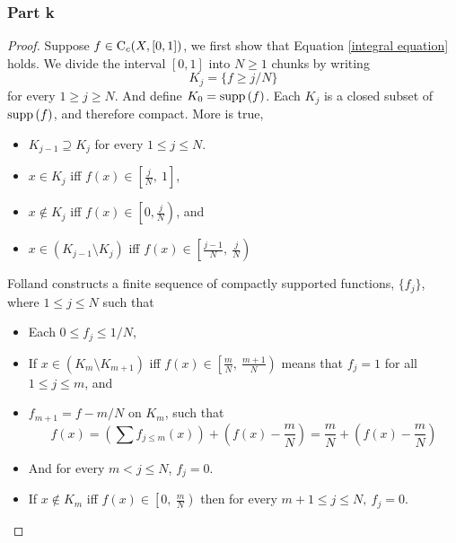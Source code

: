 \documentclass[../../main.tex]{subfiles}
\begin{document}
\subsubsection{Part k}
\begin{proof}
    Suppose $f\in\operatorname{C}_c({X,[0,1]})$, we first show that Equation \eqref{integral equation} holds. We divide the interval $[0,1]$ into $N\geq1$ chunks by writing 
    \[
    K_j = \{f\geq j/N\}
    \]
    for every $1\geq j\geq N$. And define $K_0=\operatorname{supp}{(f)}$. Each $K_j$ is a closed subset of $\operatorname{supp}{(f)}$, and therefore compact. More is true, 
    \begin{itemize}
        \item $K_{j-1}\supseteq K_j$ for every $1\leq j\leq N$.
        \item $x\in K_j$ iff $f(x)\in \left[\frac{j}{N},\: 1\right]$,
        \item $x\notin K_j$ iff $f(x)\in \left[0,\frac{j}{N}\right)$, and
        \item $x\in (K_{j-1}\setminus K_j)$ iff $f(x)\in \left[\frac{j-1}{N},\:\frac{j}{N}\right)$
    \end{itemize}
    Folland constructs a finite sequence of compactly supported functions, $\{f_j\}$, where $1\leq j \leq N$ such that
    \begin{itemize}
        \item Each $0\leq f_j\leq 1/N$,
        \item If $x\in (K_{m}\setminus K_{m+1})$ iff $f(x)\in\left[\frac{m}{N},\:\frac{m+1}{N}\right)$ means that $f_j=1$ for all $1\leq j\leq m$, and
        \item $f_{m+1} = f-m/N$ on $K_m$, such that 
        \[
        f(x) = \left(\sum f_{j\leq m}(x)\right) + \left(f(x)-\dfrac{m}{N}\right) = \dfrac{m}{N} + \left(f(x)-\dfrac{m}{N}\right)
        \]
        \item And for every $m<j\leq N$, $f_j=0$.
        \item If $x\notin K_m$ iff $f(x)\in\left[0,\:\frac{m}{N}\right)$ then for every $m+1\leq j\leq N,\:f_j=0$.
        

\end{itemize}
\end{proof}
\end{document}
